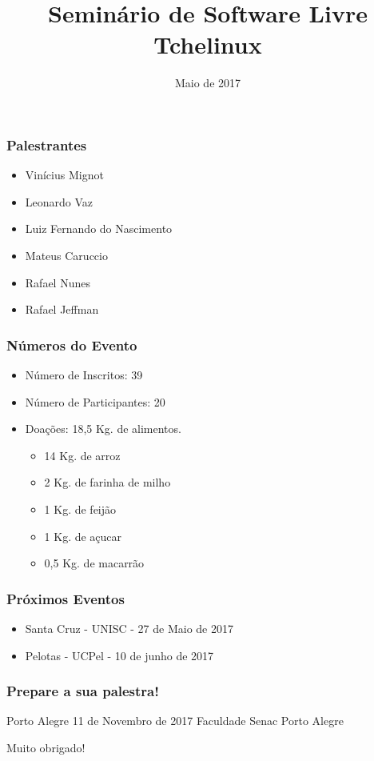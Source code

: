 \documentclass[aspectratio=169,14pt]{beamer}
\title{Seminário de Software Livre \\ Tchelinux}
\date{Maio de 2017}
\begin{document}
\begin{frame}
    \titlepage
\end{frame}

\begin{frame}
    \frametitle{Palestrantes}
    \begin{itemize}
    \item{Vinícius Mignot}
    \item{Leonardo Vaz}
    \item{Luiz Fernando do Nascimento}
    \item{Mateus Caruccio}
    \item{Rafael Nunes}
    \item{Rafael Jeffman}
    \end{itemize}
\end{frame}

\begin{frame}
    \frametitle{Números do Evento}
    \begin{itemize}
        \item{Número de Inscritos: 39 }
        \item{Número de Participantes: 20 }
        \item{Doações: 18,5 Kg. de alimentos. }
        \begin{itemize}
        \item{14 Kg. de arroz }
        \item{2 Kg. de farinha de milho }
        \item{1 Kg. de feijão }
        \item{1 Kg. de açucar }
        \item{0,5 Kg. de macarrão }
        \end{itemize}
    \end{itemize}
\end{frame}

\begin{frame}
    \frametitle{Próximos Eventos}
    \begin{itemize}
        \item{Santa Cruz - UNISC - 27 de Maio de 2017 }
        \item{Pelotas - UCPel - 10 de junho de 2017 }
    \end{itemize}
\end{frame}

\begin{frame}
    \frametitle{Prepare a sua palestra!}
    \begin{center}
        \vfill
        \Huge Porto Alegre
        \vfill
        \large 11 de Novembro de 2017
        \vfill
        Faculdade Senac Porto Alegre
        \vfill
    \end{center}
\end{frame}

\begin{frame}
    \begin{center}
        Muito obrigado!
    \end{center}
\end{frame}
\end{document}

